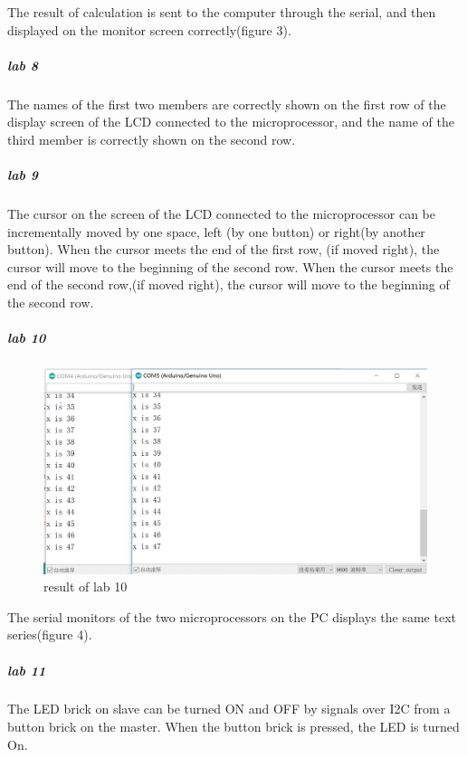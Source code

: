 The result of calculation is sent to the computer through the serial, and then displayed on the monitor screen correctly(figure 3).
\subparagraph{lab 8}
The names of the first two members are correctly shown on the first row of the display screen of the LCD connected to the microprocessor, and the name of the third member is correctly shown on the second row.
\subparagraph{lab 9}
The cursor on the screen of the LCD connected to the microprocessor can be incrementally moved by one space, left (by one button) or right(by another button). When the cursor meets the end of the first row, (if moved right), the cursor will move to the beginning of the second row. When the cursor meets the end of the second row,(if moved right), the cursor will move to the beginning of the second row.
\subparagraph{lab 10}
\begin{figure}
	\centering
	\label{fig:3}
	\includegraphics[width = \linewidth]{images/09_i2c.PNG}
	\caption{result of lab 10}
\end{figure}
The serial monitors of the two microprocessors on the PC displays the same text series(figure 4).
\subparagraph{lab 11}
The LED brick on slave can be turned ON and OFF by signals over I2C from a button brick on the master. When the button brick is pressed, the LED is turned On.